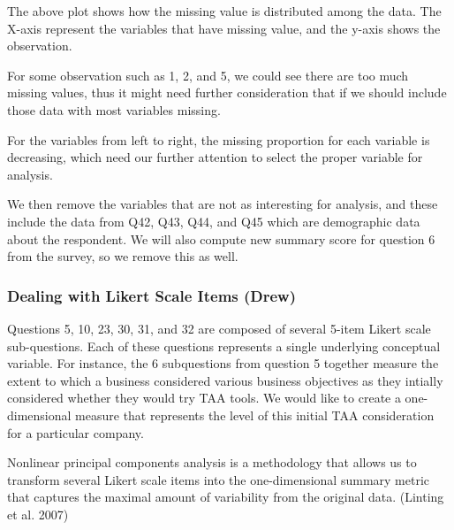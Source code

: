 \documentclass[
]{article}
\newenvironment{Shaded}{\begin{snugshade}}{\end{snugshade}}
\newcommand{\KeywordTok}[1]{\textcolor[rgb]{0.13,0.29,0.53}{\textbf{#1}}}
\newcommand{\NormalTok}[1]{#1}
\newcommand{\OperatorTok}[1]{\textcolor[rgb]{0.81,0.36,0.00}{\textbf{#1}}}
\newcommand{\StringTok}[1]{\textcolor[rgb]{0.31,0.60,0.02}{#1}}
\begin{document}
The above plot shows how the missing value is distributed among the
data. The X-axis represent the variables that have missing value, and
the y-axis shows the observation.

For some observation such as 1, 2, and 5, we could see there are too
much missing values, thus it might need further consideration that if we
should include those data with most variables missing.

For the variables from left to right, the missing proportion for each
variable is decreasing, which need our further attention to select the
proper variable for analysis.

We then remove the variables that are not as interesting for analysis,
and these include the data from Q42, Q43, Q44, and Q45 which are
demographic data about the respondent. We will also compute new summary
score for question 6 from the survey, so we remove this as well.

\begin{Shaded}
\end{Shaded}

\hypertarget{dealing-with-likert-scale-items-drew}{%
\subsubsection{Dealing with Likert Scale Items
(Drew)}\label{dealing-with-likert-scale-items-drew}}

Questions 5, 10, 23, 30, 31, and 32 are composed of several 5-item
Likert scale sub-questions. Each of these questions represents a single
underlying conceptual variable. For instance, the 6 subquestions from
question 5 together measure the extent to which a business considered
various business objectives as they intially considered whether they
would try TAA tools. We would like to create a one-dimensional measure
that represents the level of this initial TAA consideration for a
particular company.

Nonlinear principal components analysis is a methodology that allows us
to transform several Likert scale items into the one-dimensional summary
metric that captures the maximal amount of variability from the original
data. (Linting et al. 2007)
\end{document}
